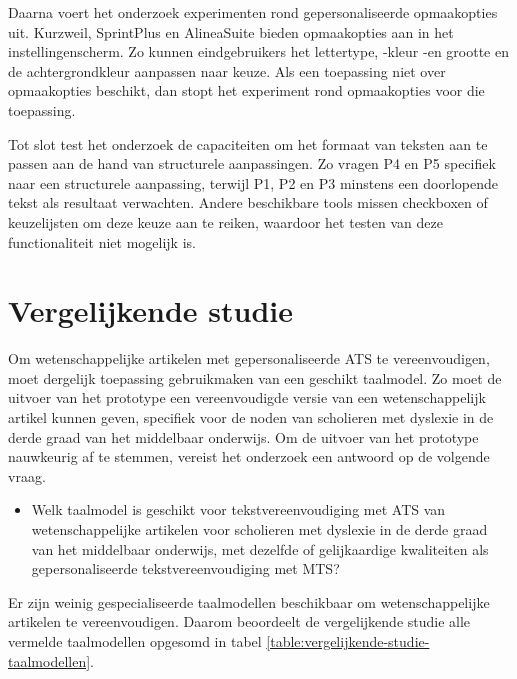 \medspace

Daarna voert het onderzoek experimenten rond gepersonaliseerde opmaakopties uit. Kurzweil, SprintPlus en AlineaSuite bieden opmaakopties aan in het instellingenscherm. Zo kunnen eindgebruikers het lettertype, -kleur -en grootte en de achtergrondkleur aanpassen naar keuze. Als een toepassing niet over opmaakopties beschikt, dan stopt het experiment rond opmaakopties voor die toepassing.

\medspace

Tot slot test het onderzoek de capaciteiten om het formaat van teksten aan te passen aan de hand van structurele aanpassingen. Zo vragen P4 en P5 specifiek naar een structurele aanpassing, terwijl P1, P2 en P3 minstens een doorlopende tekst als resultaat verwachten. Andere beschikbare tools missen checkboxen of keuzelijsten om deze keuze aan te reiken, waardoor het testen van deze functionaliteit niet mogelijk is.

\section{Vergelijkende studie}
\label{sec:vergelijkende-studie}

Om wetenschappelijke artikelen met gepersonaliseerde ATS te vereenvoudigen, moet dergelijk toepassing gebruikmaken van een geschikt taalmodel. Zo moet de uitvoer van het prototype een vereenvoudigde versie van een wetenschappelijk artikel kunnen geven, specifiek voor de noden van scholieren met dyslexie in de derde graad van het middelbaar onderwijs. Om de uitvoer van het prototype nauwkeurig af te stemmen, vereist het onderzoek een antwoord op de volgende vraag.

\begin{itemize}
	\item Welk taalmodel is geschikt voor tekstvereenvoudiging met ATS van wetenschappelijke artikelen voor scholieren met dyslexie in de derde graad van het middelbaar onderwijs, met dezelfde of gelijkaardige kwaliteiten als gepersonaliseerde tekstvereenvoudiging met MTS?
\end{itemize}

Er zijn weinig gespecialiseerde taalmodellen beschikbaar om wetenschappelijke artikelen te vereenvoudigen. Daarom beoordeelt de vergelijkende studie alle vermelde taalmodellen opgesomd in tabel \ref{table:vergelijkende-studie-taalmodellen}. 

